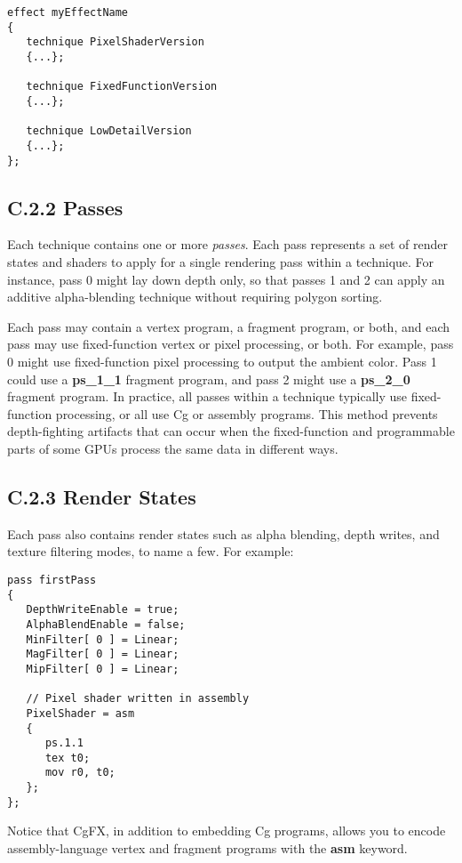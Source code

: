 \documentclass[../main.tex]{subfiles}
\begin{document}
\FloatBarrier
\begin{lstlisting}
effect myEffectName
{
   technique PixelShaderVersion
   {...};
   
   technique FixedFunctionVersion
   {...};
   
   technique LowDetailVersion
   {...};
};
\end{lstlisting}
\FloatBarrier

\subsection{C.2.2 Passes}

Each technique contains one or more \textit{passes}. Each pass represents a set of render states and shaders to apply for a single rendering pass within a technique. For instance, pass 0 might lay down depth only, so that passes 1 and 2 can apply an additive alpha-blending technique without requiring polygon sorting.

Each pass may contain a vertex program, a fragment program, or both, and each pass may use fixed-function vertex or pixel processing, or both. For example, pass 0 might use fixed-function pixel processing to output the ambient color. Pass 1 could use a \textbf{ps_1_1} fragment program, and pass 2 might use a \textbf{ps_2_0} fragment program. In practice, all passes within a technique typically use fixed-function processing, or all use Cg or assembly programs. This method prevents depth-fighting artifacts that can occur when the fixed-function and programmable parts of some GPUs process the same data in different ways.

\subsection{C.2.3 Render States}

Each pass also contains render states such as alpha blending, depth writes, and texture filtering modes, to name a few. For example:

\FloatBarrier
\begin{lstlisting}
pass firstPass
{
   DepthWriteEnable = true;
   AlphaBlendEnable = false;
   MinFilter[ 0 ] = Linear;
   MagFilter[ 0 ] = Linear;
   MipFilter[ 0 ] = Linear;
   
   // Pixel shader written in assembly
   PixelShader = asm
   {
      ps.1.1
      tex t0;
      mov r0, t0;
   };
};
\end{lstlisting}
\FloatBarrier

Notice that CgFX, in addition to embedding Cg programs, allows you to encode assembly-language vertex and fragment programs with the \textbf{asm} keyword.
\end{document}
